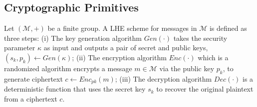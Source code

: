 \begin{comment}
\subsubsection{Computational Differential Privacy}
\begin{definition}
 (IND-CDP privacy) An ensemble $\{f_\kappa\}\kappa  \in N$ of randomized
functions $f_\kappa : D \rightarrow R_\kappa$ provides $(\epsilon,
\kappa)$-ind-cdp if there exists a negligible function $negl(\cdot)$ such that for every nonuniform p.p.t turing machine (“distinguisher”) $A$, every polynomial $p(\cdot)$, every sufficiently large $\kappa \in N$ all
data sets $D,D' \in \mathcal{D}$ of size at most $p(\kappa)$ such that $|D-D'|\leq  1$, and
every advice string $z_{\kappa}$ of size at most $p(\kappa)$, it holds that \begin{gather}
Pr [A_{\kappa}(f_{\kappa}(D)) = 1] \leq e^{\epsilon} \times Pr[A_{\kappa}(f_{\kappa}(D')) = 1]
+ negl(\kappa)\end{gather}
where we write $A_\kappa(x)$ for $A(1^{\kappa}, z_{\kappa}, x)$ and the probability is taken over
the randomness of mechanism $f_\kappa$ and adversary $A_\kappa$.
\end{definition}
\end{comment}


\subsection{Cryptographic Primitives}
Let $(\mathcal{M}, +)$ be a finite group. A \textsf{LHE} scheme
for messages in $\mathcal{M}$ is defined as three steps:
(i) The key generation algorithm $Gen(\cdot)$ takes the security parameter $\kappa$ as input and outputs
a pair of secret and public keys, $(s_k, p_k) \leftarrow Gen(\kappa)$;
(ii) The encryption algorithm $Enc(\cdot)$ which is a randomized algorithm encrypts a message $m \in \mathcal{M}$ via the public key $p_k$, to generate ciphertext $c \leftarrow Enc_{pk}(m)$;
(iii) The decryption algorithm $Dec(\cdot)$ is a deterministic function that uses the secret key $s_k$ to recover the original plaintext from a ciphertext $c$.

